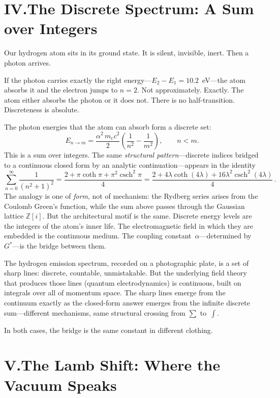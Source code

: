 \documentclass[11pt,a4paper]{article}
\newcommand{\Gstar}{G^{*}}
\DeclareMathOperator{\csch}{csch}
\begin{document}
\section*{IV.\quad The Discrete Spectrum: A Sum over Integers}

Our hydrogen atom sits in its ground state.  It is silent, invisible, inert.
Then a photon arrives.

If the photon carries exactly the right energy---$E_2-E_1=10.2$~eV---the
atom absorbs it and the electron jumps to $n=2$.  Not approximately.
Exactly.  The atom either absorbs the photon or it does not.  There is no
half-transition.  Discreteness is absolute.

The photon energies that the atom can absorb form a discrete set:
\[
E_{n\to m} = \frac{\alpha^2\,m_e c^2}{2}
\left(\frac{1}{n^2}-\frac{1}{m^2}\right),
\qquad n<m.
\]
This is a sum over integers.  The same \emph{structural pattern}---discrete
indices bridged to a continuous closed form by an analytic
continuation---appears in the identity
\[
\sum_{n=0}^{\infty}\frac{1}{(n^2+1)^2}
= \frac{2+\pi\coth\pi+\pi^2\csch^2\pi}{4}
= \frac{2+4\lambda\coth(4\lambda)+16\lambda^2\csch^2(4\lambda)}{4}\,.
\]
The analogy is one of \emph{form}, not of mechanism: the Rydberg series
arises from the Coulomb Green's function, while the sum above passes
through the Gaussian lattice $\mathbb{Z}[i]$.  But the architectural
motif is the same.  Discrete energy levels are the integers of the atom's
inner life.  The electromagnetic field in which they are embedded is the
continuous medium.  The coupling constant~$\alpha$---determined
by~$\Gstar$---is the bridge between them.

The hydrogen emission spectrum, recorded on a photographic plate, is a set
of sharp lines: discrete, countable, unmistakable.  But the underlying field
theory that produces those lines (quantum electrodynamics) is continuous,
built on integrals over all of momentum space.  The sharp lines emerge from
the continuum exactly as the closed-form answer emerges from the infinite
discrete sum---different mechanisms, same structural crossing from
$\sum$ to~$\int$.

In both cases, the bridge is the same constant in different clothing.

\section*{V.\quad The Lamb Shift: Where the Vacuum Speaks}
\end{document}
